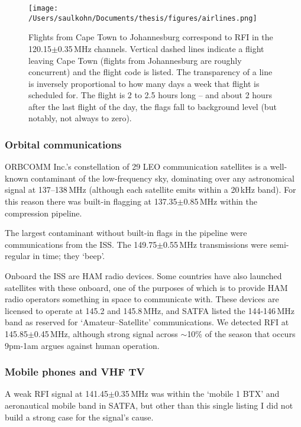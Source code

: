 \begin{figure}[h]
\centering
\texttt{[image: /Users/saulkohn/Documents/thesis/figures/airlines.png]}
\caption[Flights from Cape Town to Johannesburg correspond to RFI in the 120.15$\pm$0.35\,MHz channels.]{
Flights from Cape Town to Johannesburg correspond to RFI in the 120.15$\pm$0.35\,MHz channels. Vertical dashed lines indicate a flight leaving Cape Town (flights from Johannesburg are roughly concurrent) and the flight code is listed. The transparency of a line is inversely proportional to how many days a week that flight is scheduled for. The flight is 2 to 2.5 hours long -- and about 2 hours after the last flight of the day, the flags fall to background level (but notably, not always to zero).}
\label{fig:rfi_psa128_aircraft}
\end{figure} 

\subsubsection*{Orbital communications}
ORBCOMM Inc.'s constellation of 29 LEO communication satellites is a well-known contaminant of the low-frequency sky, dominating over any astronomical signal at 137--138\,MHz (although each satellite emits within a 20\,kHz band). For this reason there was built-in flagging at 137.35$\pm$0.85\,MHz within the compression pipeline.

The largest contaminant without built-in flags in the pipeline were communications from the ISS. The 149.75$\pm$0.55\,MHz transmissions were semi-regular in time; they `beep'. 

Onboard the ISS are HAM radio devices. Some countries have also launched satellites with these onboard, one of the purposes of which is to provide HAM radio operators something in space to communicate with. These devices are licensed to operate at 145.2 and 145.8\,MHz, and SATFA listed the 144-146\,MHz band as reserved for `Amateur--Satellite' communications. We detected RFI at 145.85$\pm$0.45\,MHz, although strong signal across $\sim$10\% of the season that occurs 9pm-1am argues against human operation.

\subsubsection*{Mobile phones and VHF TV}
A weak RFI signal at 141.45$\pm$0.35\,MHz was within the `mobile 1 BTX'  and aeronautical mobile band in SATFA, but other than this single listing I did not build a strong case for the signal's cause.

